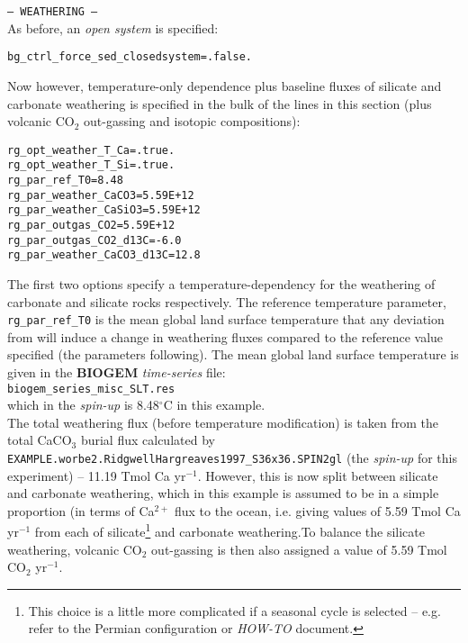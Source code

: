 \documentclass[10pt,twoside]{article}
\begin{document}
\begin{compactitem}
                \item \texttt{--- WEATHERING ---}
                \\ As before, an \textit{open  system} is specified:
\vspace{-5pt}\begin{verbatim}
bg_ctrl_force_sed_closedsystem=.false.
                \end{verbatim}\vspace{-5pt}
                Now however, temperature-only dependence plus baseline fluxes of silicate and carbonate weathering is specified in the bulk of the lines in this section (plus volcanic CO$_{2}$ out-gassing and isotopic compositions):
\vspace{-5pt}\begin{verbatim}
rg_opt_weather_T_Ca=.true.
rg_opt_weather_T_Si=.true.
rg_par_ref_T0=8.48
rg_par_weather_CaCO3=5.59E+12
rg_par_weather_CaSiO3=5.59E+12 
rg_par_outgas_CO2=5.59E+12
rg_par_outgas_CO2_d13C=-6.0
rg_par_weather_CaCO3_d13C=12.8
                \end{verbatim}\vspace{-5pt}
The first two options specify a temperature-dependency for the weathering of carbonate and silicate rocks respectively. The reference temperature parameter, \texttt{rg\_par\_ref\_T0} is the mean global land surface temperature that any deviation from will induce a change in weathering fluxes compared to the reference value specified (the parameters following). The mean global land surface temperature is given in the \textbf{BIOGEM} \textit{time-series} file:
\\\texttt{biogem\_series\_misc\_SLT.res}
\\which in the \textit{spin-up} is 8.48$^{\circ}$C in this example.
\\The total weathering flux (before temperature modification) is taken from the total CaCO$_{3}$ burial flux calculated by \texttt{EXAMPLE.worbe2.RidgwellHargreaves1997\_S36x36.SPIN2gl} (the \textit{spin-up} for this experiment) -- 11.19 Tmol Ca yr$^{-1}$. However, this is now split between silicate and carbonate weathering, which in this example is assumed to be in a simple proportion (in terms of Ca$^{2+}$ flux to the ocean, i.e. giving values of 5.59 Tmol Ca yr$^{-1}$ from each of silicate\footnote{This choice is a little more complicated if a seasonal cycle is selected -- e.g. refer to the Permian configuration or \textit{HOW-TO} document.} and carbonate weathering.To balance the silicate weathering, volcanic CO$_{2}$ out-gassing is then also assigned a value of 5.59 Tmol CO$_{2}$ yr$^{-1}$.

\end{compactitem}
\end{document}
